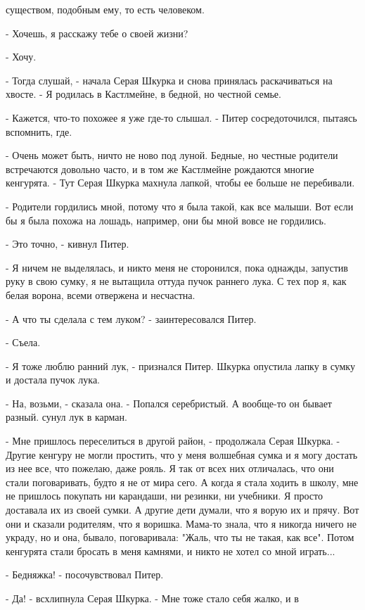 существом, подобным ему, то есть человеком.
\par- Хочешь, я расскажу тебе о своей жизни?
\par- Хочу.
\par- Тогда слушай, - начала Серая Шкурка и снова принялась 
раскачиваться на хвосте. - Я родилась в Кастлмейне, в бедной, но 
честной семье.
\par- Кажется, что-то похожее я уже где-то слышал. - Питер 
сосредоточился, пытаясь вспомнить, где.
\par- Очень может быть, ничто не ново под луной. Бедные, но честные 
родители встречаются довольно часто, и в том же Кастлмейне рождаются 
многие кенгурята. - Тут Серая Шкурка махнула лапкой, чтобы ее больше 
не перебивали.
\par- Родители гордились мной, потому что я была такой, как все 
малыши. Вот если бы я была похожа на лошадь, например, они бы мной 
вовсе не гордились.
\par- Это точно, - кивнул Питер.
\par- Я ничем не выделялась, и никто меня не сторонился, пока однажды, 
запустив руку в свою сумку, я не вытащила оттуда пучок раннего лука. С 
тех пор я, как белая ворона, всеми отвержена и несчастна.
\par- А что ты сделала с тем луком? - заинтересовался Питер.
\par- Съела.
\par- Я тоже люблю ранний лук, - признался Питер.
 Шкурка опустила лапку в сумку и достала пучок лука.
\par- На, возьми, - сказала она. - Попался серебристый. А вообще-то он 
бывает разный.
 сунул лук в карман.
\par- Мне пришлось переселиться в другой район, - продолжала Серая 
Шкурка. - Другие кенгуру не могли простить, что у меня волшебная сумка 
и я могу достать из нее все, что пожелаю, даже рояль. Я так от всех 
них отличалась, что они стали поговаривать, будто я не от мира сего. А 
когда я стала ходить в школу, мне не пришлось покупать ни карандаши, 
ни резинки, ни учебники. Я просто доставала их из своей сумки. А 
другие дети думали, что я ворую их и прячу. Вот они и сказали 
родителям, что я воришка. Мама-то знала, что я никогда ничего не 
украду, но и она, бывало, поговаривала: "Жаль, что ты не такая, как 
все". Потом кенгурята стали бросать в меня камнями, и никто не хотел 
со мной играть...
\par- Бедняжка! - посочувствовал Питер.
\par- Да! - всхлипнула Серая Шкурка. - Мне тоже стало себя жалко, и в 
